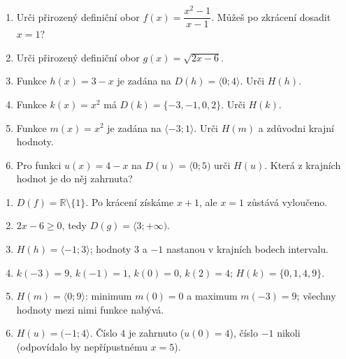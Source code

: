 \documentclass[11pt,a4paper]{article}
\begin{document}
\begin{zadaniReseniBox}[title={Domácí úkol}]
\begin{enumerate}[label=\alph*)]
\item Urči přirozený definiční obor $f(x)=\dfrac{x^2-1}{x-1}$.
Můžeš po zkrácení dosadit $x=1$?
\item Urči přirozený definiční obor $g(x)=\sqrt{2x-6}$.
\item Funkce $h(x)=3-x$ je zadána na $D(h)=\langle0;4\rangle$.
Urči $H(h)$.
\item Funkce $k(x)=x^2$ má $D(k)=\{-3,-1,0,2\}$.
Urči $H(k)$.
\item Funkce $m(x)=x^2$ je zadána na $\langle-3;1\rangle$.
Urči $H(m)$ a zdůvodni krajní hodnoty.
\item Pro funkci $u(x)=4-x$ na $D(u)=\langle0;5)$
urči $H(u)$. Která z krajních hodnot je do něj zahrnuta?
\end{enumerate}
\tcblower
\begin{enumerate}[label=\alph*)]
\item $D(f)=\mathbb R\setminus\{1\}$. Po krácení získáme $x+1$,
ale $x=1$ zůstává vyloučeno.
\item $2x-6\ge0$, tedy $D(g)=\langle3;+\infty)$.
\item $H(h)=\langle-1;3\rangle$; hodnoty $3$ a $-1$ nastanou
v krajních bodech intervalu.
\item $k(-3)=9$, $k(-1)=1$, $k(0)=0$, $k(2)=4$;
$H(k)=\{0,1,4,9\}$.
\item $H(m)=\langle0;9\rangle$: minimum $m(0)=0$ a maximum
$m(-3)=9$; všechny hodnoty mezi nimi funkce nabývá.
\item $H(u)=(-1;4\rangle$. Číslo $4$ je zahrnuto ($u(0)=4$),
číslo $-1$ nikoli (odpovídalo by nepřípustnému $x=5$).
\end{enumerate}
\end{zadaniReseniBox}
\end{document}
